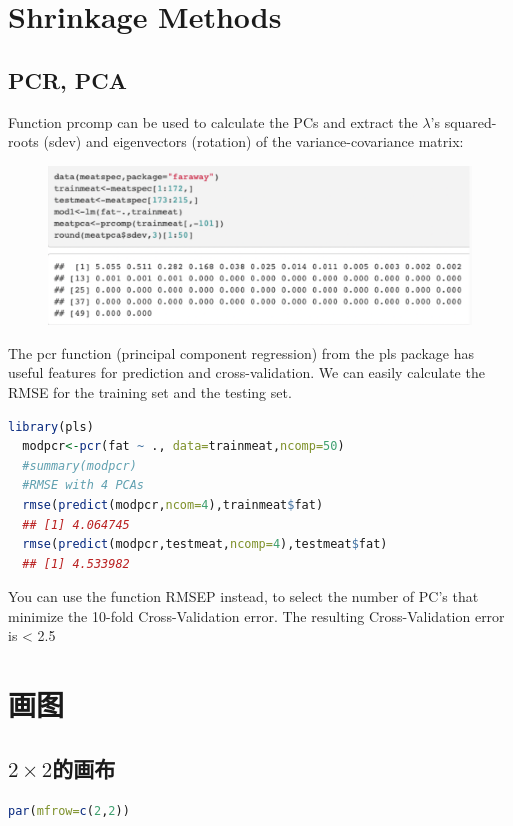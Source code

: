 \documentclass[11pt,a4paper]{article}
\begin{document}
\section{Shrinkage Methods}
\subsection{PCR, PCA}
Function prcomp can be used to calculate the PCs and extract the $\lambda$’s squared-roots (sdev) and eigenvectors (rotation) of the variance-covariance matrix:
\begin{center}\begin{figure}[htbp]
  \centering
  \includegraphics[scale=0.5]{prcomp}
  \caption{}
  \label{}
\end{figure}\end{center}

The pcr function (principal component regression) from the pls package has useful features for prediction and cross-validation. We can easily calculate the RMSE for the training set and the testing set.
\begin{lstlisting}[language=R]
  library(pls)
  modpcr<-pcr(fat ~ ., data=trainmeat,ncomp=50)
  #summary(modpcr)
  #RMSE with 4 PCAs
  rmse(predict(modpcr,ncom=4),trainmeat$fat) 
  ## [1] 4.064745
  rmse(predict(modpcr,testmeat,ncomp=4),testmeat$fat)
  ## [1] 4.533982
\end{lstlisting}
You can use the function RMSEP instead, to select the number of PC’s that minimize the 10-fold Cross-Validation error. The resulting Cross-Validation error is < 2.5











\section{画图}

\subsection{$2\times2$的画布}
\begin{lstlisting}[language=R]
par(mfrow=c(2,2))
\end{lstlisting}
\end{document}
